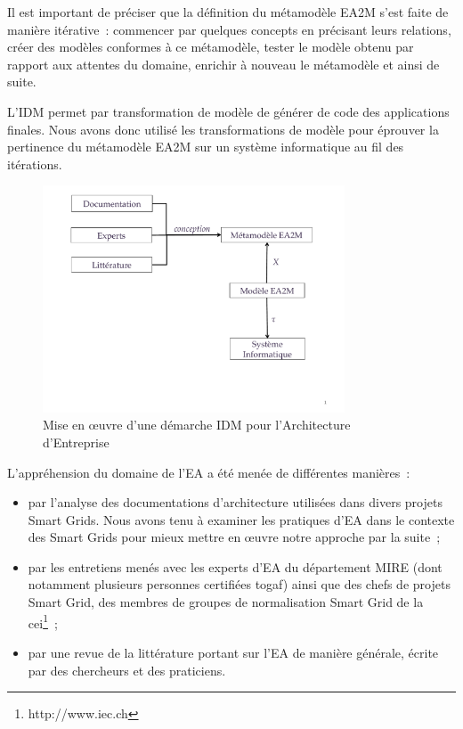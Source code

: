     Il est important de préciser que la définition du métamodèle EA2M s'est faite de manière
    itérative~: commencer par quelques concepts en précisant leurs relations,
    créer des modèles conformes à ce métamodèle, tester le modèle obtenu par rapport
    aux attentes du domaine, enrichir à nouveau le métamodèle et ainsi de suite.

    L'IDM permet par transformation de modèle de générer de code des applications
    finales. Nous avons donc utilisé les transformations de modèle pour éprouver la pertinence du métamodèle
    EA2M sur un système informatique au fil des itérations.


    \begin{figure}[!ht]
         \begin{center}
        \includegraphics[trim=0cm 4cm 0cm 0cm, width=0.8\textwidth]{figures/4_demarche/demarche_idm.pdf}
         \end{center}
         \caption{Mise en œuvre d'une démarche IDM pour l'Architecture
         d'Entreprise}
         \label{fig:demarche_idem}
    \end{figure}

    L'appréhension du domaine de l'EA a été menée de différentes manières~:

    \begin{itemize}

        \item par l'analyse des documentations d'architecture utilisées dans divers projets Smart
    Grids. Nous avons tenu à examiner les pratiques d'EA dans le contexte des Smart Grids
    pour mieux mettre en œuvre notre approche par la suite~;

        \item par les entretiens menés avec les experts d'EA du département MIRE (dont notamment
    plusieurs personnes certifiées \gls{togaf}) ainsi que des chefs de projets Smart Grid,
    des membres de groupes de normalisation Smart Grid de la \gls{cei}\footnote{http://www.iec.ch}~;

        \item par une revue de la littérature portant sur l'EA de manière générale,
        écrite par des chercheurs et des praticiens.

    \end{itemize}


